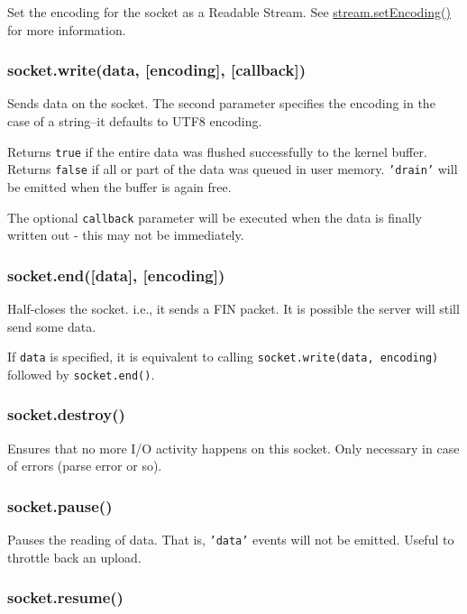 Set the encoding for the socket as a Readable Stream. See
\href{stream.html\#stream\_stream\_setencoding\_encoding}{stream.setEncoding()}
for more information.

\subsubsection{socket.write(data, {[}encoding{]}, {[}callback{]})}

Sends data on the socket. The second parameter specifies the encoding in
the case of a string--it defaults to UTF8 encoding.

Returns \texttt{true} if the entire data was flushed successfully to the
kernel buffer. Returns \texttt{false} if all or part of the data was
queued in user memory. \texttt{'drain'} will be emitted when the buffer
is again free.

The optional \texttt{callback} parameter will be executed when the data
is finally written out - this may not be immediately.

\subsubsection{socket.end({[}data{]}, {[}encoding{]})}

Half-closes the socket. i.e., it sends a FIN packet. It is possible the
server will still send some data.

If \texttt{data} is specified, it is equivalent to calling
\texttt{socket.write(data, encoding)} followed by \texttt{socket.end()}.

\subsubsection{socket.destroy()}

Ensures that no more I/O activity happens on this socket. Only necessary
in case of errors (parse error or so).

\subsubsection{socket.pause()}

Pauses the reading of data. That is, \texttt{'data'} events will not be
emitted. Useful to throttle back an upload.

\subsubsection{socket.resume()}

